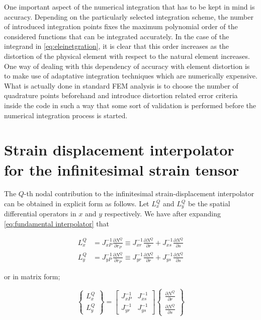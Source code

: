 One important aspect of the numerical integration that has to be kept in mind is accuracy.  Depending on the particularly selected integration scheme, the number of introduced integration points fixes the maximum polynomial order of the considered functions that can be integrated accurately.  In the case of the integrand in \cref{eq:eleinetgration}, it is clear that this order increases as the distortion of the physical element  with respect to the natural element increases.  One way of dealing with this dependency of accuracy with element distortion is to make use of adaptative integration techniques which are numerically expensive.  What is actually done in standard FEM analysis is to choose the number of quadrature points beforehand and introduce distortion related error criteria inside the code in such a way that some sort of validation is performed before the numerical integration process is started.

\section*{Strain displacement interpolator for the infinitesimal strain tensor}
The $Q$-th nodal contribution to the infinitesimal strain-displacement interpolator can be obtained in explicit form as follows. Let $L_x^Q$ and $L_y^Q$ be the spatial differential operators in $x$ and $y$ respectively. We have after expanding \cref{eq:fundamental interpolator}  that

\begin{align*}
L_x^Q & = J_{xP}^{ - 1}\frac{{\partial {N^Q}}}{{\partial {r_P}}} \equiv J_{xr}^{ - 1}\frac{{\partial {N^Q}}}{{\partial r}} + J_{xs}^{ - 1}\frac{{\partial {N^Q}}}{{\partial s}}\\
L_y^Q & = J_{yP}^{ - 1}\frac{{\partial {N^Q}}}{{\partial {r_P}}} \equiv J_{yr}^{ - 1}\frac{{\partial {N^Q}}}{{\partial r}} + J_{ys}^{ - 1}\frac{{\partial {N^Q}}}{{\partial s}}
\end{align*}

or in matrix form;

\begin{equation}
\left\{ {\begin{array}{*{20}{c}}
{L_x^Q}\\
{L_y^Q}
\end{array}} \right\} = \left[ {\begin{array}{*{20}{c}}
{J_{xP}^{ - 1}}&{J_{xs}^{ - 1}}\\
{J_{yr}^{ - 1}}&{J_{ys}^{ - 1}}
\end{array}} \right]\left\{ {\begin{array}{*{20}{c}}
{\frac{{\partial {N^Q}}}{{\partial r}}}\\
{\frac{{\partial {N^Q}}}{{\partial s}}}
\end{array}} \right\}
\end{equation}

